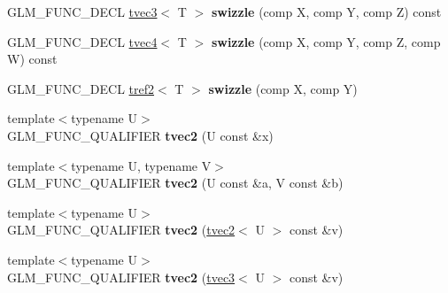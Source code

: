 \begin{DoxyCompactItemize}
\item 
\hypertarget{structglm_1_1detail_1_1tvec2_aeaf8442e0128983acffe4c8f180a4afa}{}G\+L\+M\+\_\+\+F\+U\+N\+C\+\_\+\+D\+E\+C\+L \hyperlink{structglm_1_1detail_1_1tvec3}{tvec3}$<$ T $>$ {\bfseries swizzle} (comp X, comp Y, comp Z) const \label{structglm_1_1detail_1_1tvec2_aeaf8442e0128983acffe4c8f180a4afa}

\item 
\hypertarget{structglm_1_1detail_1_1tvec2_ab57980ed556297a8698f995d20336d07}{}G\+L\+M\+\_\+\+F\+U\+N\+C\+\_\+\+D\+E\+C\+L \hyperlink{structglm_1_1detail_1_1tvec4}{tvec4}$<$ T $>$ {\bfseries swizzle} (comp X, comp Y, comp Z, comp W) const \label{structglm_1_1detail_1_1tvec2_ab57980ed556297a8698f995d20336d07}

\item 
\hypertarget{structglm_1_1detail_1_1tvec2_a3a37005b6484b97af0d7b10de75303cf}{}G\+L\+M\+\_\+\+F\+U\+N\+C\+\_\+\+D\+E\+C\+L \hyperlink{structglm_1_1detail_1_1tref2}{tref2}$<$ T $>$ {\bfseries swizzle} (comp X, comp Y)\label{structglm_1_1detail_1_1tvec2_a3a37005b6484b97af0d7b10de75303cf}

\item 
\hypertarget{structglm_1_1detail_1_1tvec2_acec9b5852d2e93f20ff7817999b01d73}{}{\footnotesize template$<$typename U$>$ }\\G\+L\+M\+\_\+\+F\+U\+N\+C\+\_\+\+Q\+U\+A\+L\+I\+F\+I\+E\+R {\bfseries tvec2} (U const \&x)\label{structglm_1_1detail_1_1tvec2_acec9b5852d2e93f20ff7817999b01d73}

\item 
\hypertarget{structglm_1_1detail_1_1tvec2_aad60307a2db67b5990d60e9fae0f3bee}{}{\footnotesize template$<$typename U, typename V$>$ }\\G\+L\+M\+\_\+\+F\+U\+N\+C\+\_\+\+Q\+U\+A\+L\+I\+F\+I\+E\+R {\bfseries tvec2} (U const \&a, V const \&b)\label{structglm_1_1detail_1_1tvec2_aad60307a2db67b5990d60e9fae0f3bee}

\item 
\hypertarget{structglm_1_1detail_1_1tvec2_ac62143e85db688ebdd281d60c237dda7}{}{\footnotesize template$<$typename U$>$ }\\G\+L\+M\+\_\+\+F\+U\+N\+C\+\_\+\+Q\+U\+A\+L\+I\+F\+I\+E\+R {\bfseries tvec2} (\hyperlink{structglm_1_1detail_1_1tvec2}{tvec2}$<$ U $>$ const \&v)\label{structglm_1_1detail_1_1tvec2_ac62143e85db688ebdd281d60c237dda7}

\item 
\hypertarget{structglm_1_1detail_1_1tvec2_a7ffc001d6841e90b8f9cffd818d61019}{}{\footnotesize template$<$typename U$>$ }\\G\+L\+M\+\_\+\+F\+U\+N\+C\+\_\+\+Q\+U\+A\+L\+I\+F\+I\+E\+R {\bfseries tvec2} (\hyperlink{structglm_1_1detail_1_1tvec3}{tvec3}$<$ U $>$ const \&v)\label{structglm_1_1detail_1_1tvec2_a7ffc001d6841e90b8f9cffd818d61019}


\end{DoxyCompactItemize}
